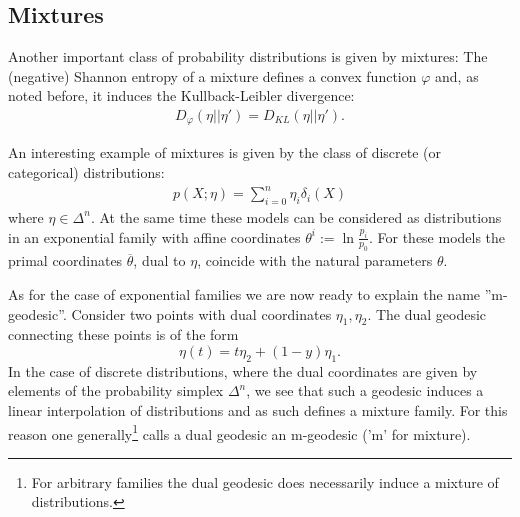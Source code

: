 \subsection{Mixtures}

    Another important class of probability distributions is given by mixtures:
    The (negative) Shannon entropy of a mixture defines a convex function $\varphi$ and, as noted before, it induces the Kullback-Leibler divergence:
    \begin{gather}
        D_\varphi(\eta||\eta') = D_{KL}(\eta||\eta').
    \end{gather}

    \begin{example}
        An interesting example of mixtures is given by the class of discrete (or categorical) distributions:
        \begin{gather}
            p(X;\eta) = \sum_{i=0}^n\eta_i\delta_i(X)
        \end{gather}
        where $\eta\in\Delta^n$. At the same time these models can be considered as distributions in an exponential family with affine coordinates $\theta^i:=\ln\frac{p_i}{p_0}$. For these models the primal coordinates $\overline{\theta}$, dual to $\eta$, coincide with the natural parameters $\theta$.
    \end{example}

    As for the case of exponential families we are now ready to explain the name ''m-geodesic''. Consider two points with dual coordinates $\eta_1,\eta_2$. The dual geodesic connecting these points is of the form \[\eta(t) = t\eta_2 + (1-y)\eta_1.\] In the case of discrete distributions, where the dual coordinates are given by elements of the probability simplex $\Delta^n$, we see that such a geodesic induces a linear interpolation of distributions and as such defines a mixture family. For this reason one generally\footnote{For arbitrary families the dual geodesic does necessarily induce a mixture of distributions.} calls a dual geodesic an m-geodesic ('m' for mixture).

